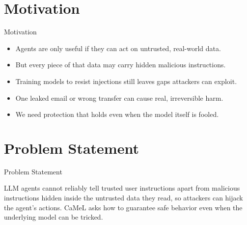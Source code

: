 \documentclass[10pt]{beamer}
\begin{document}
\section{Motivation}
\begin{frame}{Motivation}
\begin{itemize}
  \item Agents are only useful if they can act on untrusted, real-world data.
  \item But every piece of that data may carry hidden malicious instructions.
  \item Training models to resist injections still leaves gaps attackers can exploit.
  \item One leaked email or wrong transfer can cause real, irreversible harm.
  \item We need protection that holds even when the model itself is fooled.
\end{itemize}
\end{frame}
\section{Problem Statement}
\begin{frame}{Problem Statement}
  \begin{block}{}
  LLM agents cannot reliably tell trusted user instructions apart from malicious instructions hidden inside the untrusted data they read, so attackers can hijack the agent's actions. CaMeL asks how to guarantee safe behavior even when the underlying model can be tricked.
  \end{block}
\end{frame}
\end{document}
